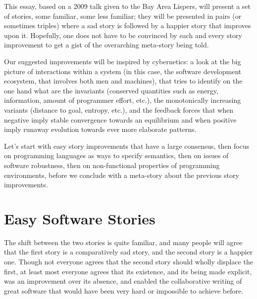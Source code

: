 \documentclass[a4paper,UKenglish]{lipics}
\begin{document}
This essay, based on a 2009 talk given to the Bay Area Lispers,
will present a set of stories, some familiar, some less familiar;
they will be presented in pairs (or sometimes triples)
where a sad story is followed by a happier story that improves upon it.
Hopefully, one does not have to be convinced by each and every story improvement
to get a gist of the overarching meta-story being told.

Our suggested improvements will be inspired by cybernetics:
a look at the big picture of interactions within a system
(in this case, the software development ecosystem, that involves both men and machines),
that tries to identify on the one hand what are the invariants
(conserved quantities such as energy, information,
amount of programmer effort, etc.),
the monotonically increasing variants
(distance to goal, entropy, etc.),
and the feedback forces that when negative imply
stable convergence towards an equilibrium
and when positive imply runaway evolution
towards ever more elaborate patterns.

Let's start with easy story improvements that have a large consensus,
then focus on programming languages as ways to specify semantics,
then on issues of software robustness,
then on non-functional properties of programming environments,
before we conclude with a meta-story about the previous story improvements.

\section{Easy Software Stories}

The shift between the two stories is quite familiar, and many people will agree that
the first story is a comparatively sad story, and the second story is a happier one.
Though not everyone agrees that the second story should wholly displace the first,
at least most everyone agrees that its existence, and its being made explicit,
was an improvement over its absence, and enabled the collaborative writing of great software
that would have been very hard or impossible to achieve before.
\end{document}
